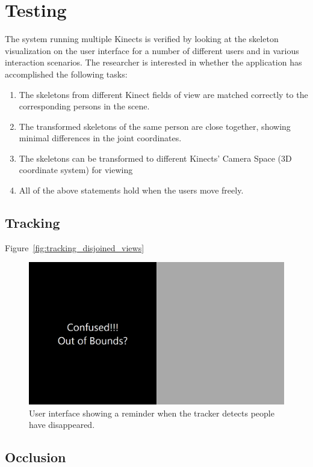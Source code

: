 


\chapter{Testing}

\label{chapter:testing}

The system running multiple Kinects is verified by looking at the skeleton visualization on the user interface for a number of different users and in various interaction scenarios. The researcher is interested in whether the application has accomplished the following tasks:

\begin{enumerate}
  \item The skeletons from different Kinect fields of view are matched correctly to the corresponding persons in the scene.
  \item The transformed skeletons of the same person are close together, showing minimal differences in the joint coordinates.
  \item The skeletons can be transformed to different Kinects' Camera Space (3D coordinate system) for viewing
  \item All of the above statements hold when the users move freely.
\end{enumerate}

\section{Tracking}

Figure~\ref{fig:tracking_disjoined_views}

\begin{figure}[!h]
  \centering
  
  \includegraphics[width=0.5\linewidth]{figs/confused}

  \caption{User interface showing a reminder when the tracker detects people have disappeared.}
  
  \label{fig:tracking_confused}
\end{figure}

\section{Occlusion}

